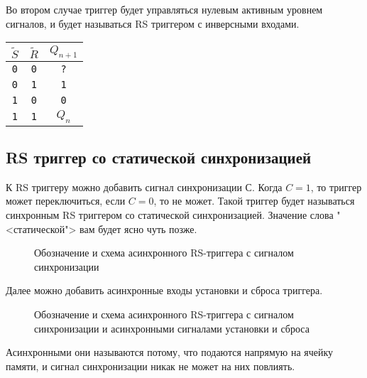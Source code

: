 Во втором случае триггер будет управляться нулевым активным уровнем сигналов, и будет называться RS триггером с инверсными входами.

\begin{table}[h]
\centering
\begin{tabular}{|c|c|c|}
\hline
$\tilde S$ & $\tilde R$ & $Q_{n+1}$   \\ \hline
\texttt{0} & \texttt{0} & \texttt{?}  \\
\texttt{0} & \texttt{1} & \texttt{1}  \\
\texttt{1} & \texttt{0} & \texttt{0}  \\
\texttt{1} & \texttt{1} & $Q_n$       \\
\hline
\end{tabular}
\end{table}

\subsection{RS триггер со статической синхронизацией}

К RS триггеру можно добавить сигнал синхронизации $С$. Когда $C=1$, то триггер может переключиться, если $C=0$, то не может. Такой триггер будет называться синхронным RS триггером со статической синхронизацией. Значение слова "<статической"> вам будет ясно чуть позже.

\begin{figure}[ht]
\centering
{}
\caption{Обозначение и схема асинхронного RS-триггера с сигналом синхронизации}
\label{RS_trigger_C_arch}
\end{figure}

Далее можно добавить асинхронные входы установки и сброса триггера.

\begin{figure}[ht]
\centering
{}
\caption{Обозначение и схема асинхронного RS-триггера с сигналом синхронизации и асинхронными сигналами установки и сброса}
\label{RS_trigger_C_ARS_arch}
\end{figure}

Асинхронными они называются потому, что подаются напрямую на ячейку памяти, и сигнал синхронизации никак не может на них повлиять.

